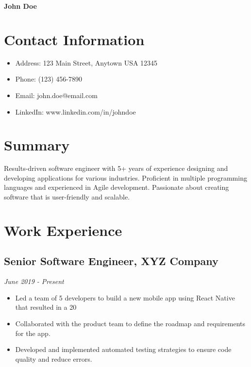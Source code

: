 \documentclass[11pt,a4paper]{article}
\begin{document}
\begin{center}
{\huge\bfseries John Doe}
\end{center}

\vspace{0.5em}

\section{Contact Information}

\begin{itemize}
\item Address: 123 Main Street, Anytown USA 12345
\item Phone: (123) 456-7890
\item Email: john.doe@email.com
\item LinkedIn: www.linkedin.com/in/johndoe
\end{itemize}

\section{Summary}

Results-driven software engineer with 5+ years of experience designing and developing applications for various industries. Proficient in multiple programming languages and experienced in Agile development. Passionate about creating software that is user-friendly and scalable.

\section{Work Experience}

\subsection{Senior Software Engineer, XYZ Company}

\textit{June 2019 - Present}

\begin{itemize}
\item Led a team of 5 developers to build a new mobile app using React Native that resulted in a 20%
\item Collaborated with the product team to define the roadmap and requirements for the app.
\item Developed and implemented automated testing strategies to ensure code quality and reduce errors.
\end{itemize}
\end{document}
